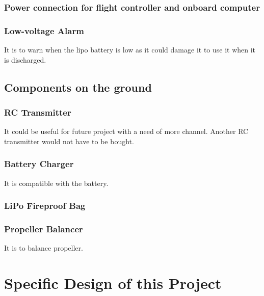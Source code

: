 \subsubsection{Power connection for flight controller and onboard computer}

\subsubsection{Low-voltage Alarm}
It is to warn when the lipo battery is low as it could damage it to use it when it is discharged.


\subsection{Components on the ground}

\subsubsection{RC Transmitter}
It could be useful for future project with a need of more channel. Another RC transmitter would not have to be bought.

\subsubsection{Battery Charger}
It is compatible with the battery.

\subsubsection{LiPo Fireproof Bag}

\subsubsection{Propeller Balancer}
It is to balance propeller.





\section{Specific Design of this Project}



